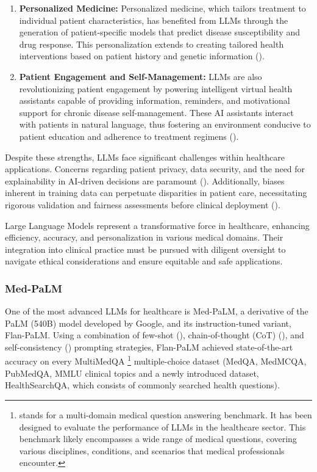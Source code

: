 \begin{enumerate}
	\item \textbf{Personalized Medicine:}{
		      Personalized medicine, which tailors treatment to individual patient characteristics, has benefited from LLMs through the generation of patient-specific models that predict disease susceptibility and drug response. This personalization extends to creating tailored health interventions based on patient history and genetic information (\textcite{hamburg2010path}).
	      }

	\item \textbf{Patient Engagement and Self-Management:}{
		      LLMs are also revolutionizing patient engagement by powering intelligent virtual health assistants capable of providing information, reminders, and motivational support for chronic disease self-management. These AI assistants interact with patients in natural language, thus fostering an environment conducive to patient education and adherence to treatment regimens (\textcite{kocaballi2019personalization}).
	      }
\end{enumerate}

Despite these strengths, LLMs face significant challenges within healthcare applications.
Concerns regarding patient privacy, data security, and the need for explainability in AI-driven decisions are paramount (\textcite{beam2018big}).
Additionally, biases inherent in training data can perpetuate disparities in patient care, necessitating rigorous validation and fairness assessments before clinical deployment (\textcite{chen2019single}).

Large Language Models represent a transformative force in healthcare, enhancing efficiency, accuracy, and personalization in various medical domains.
Their integration into clinical practice must be pursued with diligent oversight to navigate ethical considerations and ensure equitable and safe applications.

\subsubsection{Med-PaLM}
\label{subsubsec:med-palm}

One of the most advanced LLMs for healthcare is Med-PaLM, a derivative of the PaLM (540B) model developed by Google, and its instruction-tuned variant, Flan-PaLM. Using a combination of few-shot (\textcite{brown2020language}), chain-of-thought (CoT) (\textcite{wei2022chain}), and self-consistency (\textcite{wang2022self}) prompting strategies, Flan-PaLM achieved state-of-the-art accuracy on every MultiMedQA \footnote{stands for a multi-domain medical question answering benchmark. It has been designed to evaluate the performance of LLMs in the healthcare sector.
	This benchmark likely encompasses a wide range of medical questions, covering various disciplines, conditions, and scenarios that medical professionals encounter.} multiple-choice dataset (MedQA, MedMCQA, PubMedQA, MMLU clinical topics and a newly introduced dataset, HealthSearchQA, which consists of commonly searched health questions).

